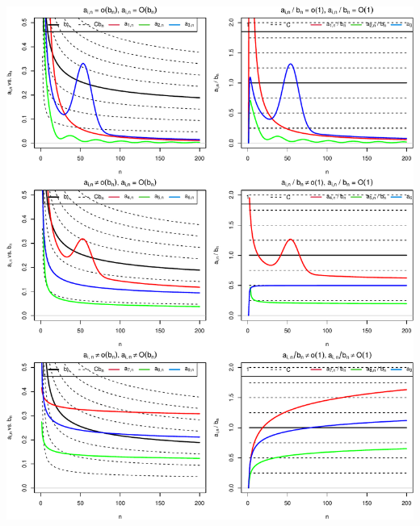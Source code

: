 \documentclass[
  13pt,
  letterpaper,
  DIV=11,
  numbers=noendperiod]{scrreprt}
\theoremstyle{definition}
\theoremstyle{plain}
\theoremstyle{definition}
\theoremstyle{plain}
\theoremstyle{plain}
\theoremstyle{definition}
\theoremstyle{remark}
\begin{document}
\begin{center}
\includegraphics{bigoh_files/figure-pdf/unnamed-chunk-1-1.pdf}
\end{center}
\end{document}
